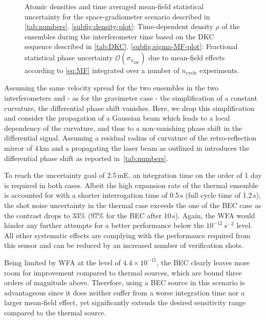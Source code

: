 \begin{figure}[h!]
    \centering
    \resizebox{0.9\linewidth}{!}{
        
        }
    \caption{Atomic densities and time averaged mean-field statistical uncertainty for the space-gradiometer scenario described in \autoref{tab:numbers}. \autoref{subfig:density-plot}: Time-dependent density $\rho$ of the ensembles during the interferometer time based on the DKC sequence described in \autoref{tab:DKC}. \autoref{subfig:sigma-MF-plot}: Fractional statistical phase uncertainty $\mathcal{O}(\sigma_{\phi_\text{MF}})$ due to mean-field effects according to \autoref{eq:MF} integrated over a number of $n_\text{cycle}$ experiments. }
    \label{fig:MF-effects}
\end{figure}

Assuming the same velocity spread for the two ensembles in the two interferometers and - as for the gravimeter case - the simplification of a constant curvature, the differential phase shift vanishes. Here, we drop this simplification and consider the propagation of a Gaussian beam which leads to a local dependency of the curvature, and thus to a non-vanishing phase shift in the differential signal. Assuming a residual radius of curvature of the retro-reflection mirror of 4\,km and a propagating the laser beam as outlined in \cite{Trimeche2019} introduces the differential phase shift as reported in~\autoref{tab:numbers}.
 
To reach the uncertainty goal of 2.5\,mE, an integration time on the order of 1 day is required in both cases. Albeit the high expansion rate of the thermal ensemble is accounted for with a shorter interrogation time of 0.5\,s (full cycle time of 1.2\,s), the shot noise uncertainty in the thermal case exceeds the one of the BEC case as the contrast drops to 33\% (97\% for the BEC after 10\,s).
Again, the WFA would hinder any further attempts for a better performance below the $10^{-12}\,s^{-2}$ level. All other systematic effects are complying with the performance required from this sensor and can be reduced by an increased number of verification shots. 

Being limited by WFA at the level of $4.4\times10^{-15}$, the BEC clearly leaves more room for improvement compared to thermal sources, which are bound three orders of magnitude above. Therefore, using a BEC source in this scenario is advantageous since it does neither suffer from a worse integration time nor a larger mean-field effect, yet significantly extends the desired sensitivity range compared to the thermal source.

